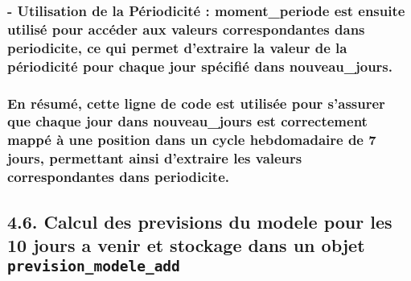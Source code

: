 \documentclass[
]{article}
\newenvironment{Shaded}{\begin{snugshade}}{\end{snugshade}}
\newcommand{\AttributeTok}[1]{\textcolor[rgb]{0.13,0.29,0.53}{#1}}
\newcommand{\CommentTok}[1]{\textcolor[rgb]{0.56,0.35,0.01}{\textit{#1}}}
\newcommand{\DecValTok}[1]{\textcolor[rgb]{0.00,0.00,0.81}{#1}}
\newcommand{\FunctionTok}[1]{\textcolor[rgb]{0.13,0.29,0.53}{\textbf{#1}}}
\newcommand{\NormalTok}[1]{#1}
\newcommand{\OtherTok}[1]{\textcolor[rgb]{0.56,0.35,0.01}{#1}}
\newcommand{\SpecialCharTok}[1]{\textcolor[rgb]{0.81,0.36,0.00}{\textbf{#1}}}
\begin{document}
\subsubsection{- Utilisation de la Périodicité : moment\_periode est
ensuite utilisé pour accéder aux valeurs correspondantes dans
periodicite, ce qui permet d'extraire la valeur de la périodicité pour
chaque jour spécifié dans
nouveau\_jours.}\label{utilisation-de-la-puxe9riodicituxe9-moment_periode-est-ensuite-utilisuxe9-pour-accuxe9der-aux-valeurs-correspondantes-dans-periodicite-ce-qui-permet-dextraire-la-valeur-de-la-puxe9riodicituxe9-pour-chaque-jour-spuxe9cifiuxe9-dans-nouveau_jours.}

\subsubsection{En résumé, cette ligne de code est utilisée pour
s'assurer que chaque jour dans nouveau\_jours est correctement mappé à
une position dans un cycle hebdomadaire de 7 jours, permettant ainsi
d'extraire les valeurs correspondantes dans
periodicite.}\label{en-ruxe9sumuxe9-cette-ligne-de-code-est-utilisuxe9e-pour-sassurer-que-chaque-jour-dans-nouveau_jours-est-correctement-mappuxe9-uxe0-une-position-dans-un-cycle-hebdomadaire-de-7-jours-permettant-ainsi-dextraire-les-valeurs-correspondantes-dans-periodicite.}

\subsection{\texorpdfstring{4.6. Calcul des previsions du modele pour
les 10 jours a venir et stockage dans un objet
\texttt{prevision\_modele\_add}}{4.6. Calcul des previsions du modele pour les 10 jours a venir et stockage dans un objet prevision\_modele\_add}}\label{calcul-des-previsions-du-modele-pour-les-10-jours-a-venir-et-stockage-dans-un-objet-prevision_modele_add}

\begin{Shaded}
\end{Shaded}
\end{document}
